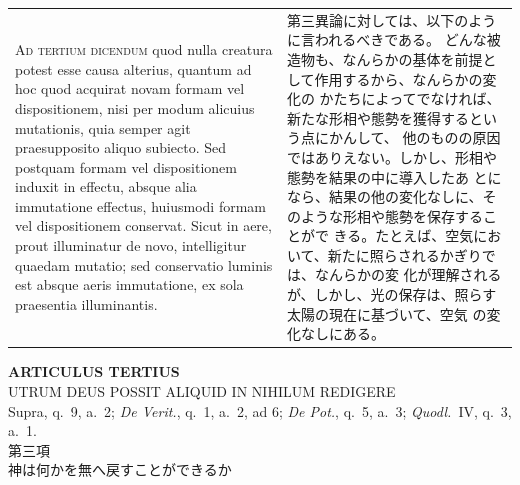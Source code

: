 \documentclass[paper=a4paper,fontsize=10pt,jafontsize=9pt,titlepage]{jlreq}
\begin{document}
\begin{longtable}{p{21em}p{21em}}
\\


{\scshape Ad tertium dicendum} quod nulla creatura
potest esse causa alterius, quantum ad hoc quod acquirat novam formam
vel dispositionem, nisi per modum alicuius mutationis, quia semper agit
praesupposito aliquo subiecto. Sed postquam formam vel dispositionem
induxit in effectu, absque alia immutatione effectus, huiusmodi formam
vel dispositionem conservat. Sicut in aere, prout illuminatur de novo,
intelligitur quaedam mutatio; sed conservatio luminis est absque aeris
immutatione, ex sola praesentia illuminantis.

&


第三異論に対しては、以下のように言われるべきである。
どんな被造物も、なんらかの基体を前提として作用するから、なんらかの変化の
 かたちによってでなければ、新たな形相や態勢を獲得するという点にかんして、
 他のものの原因ではありえない。しかし、形相や態勢を結果の中に導入したあ
 とになら、結果の他の変化なしに、そのような形相や態勢を保存することがで
 きる。たとえば、空気において、新たに照らされるかぎりでは、なんらかの変
 化が理解されるが、しかし、光の保存は、照らす太陽の現在に基づいて、空気
 の変化なしにある。


\end{longtable}
\newpage





\begin{center}
 {\Large {\bfseries ARTICULUS TERTIUS}}\\
 {\large UTRUM DEUS POSSIT ALIQUID IN NIHILUM REDIGERE}\\
 {\footnotesize Supra, q.~9, a.~2; {\itshape De Verit.}, q.~1, a.~2, ad
 6; {\itshape De Pot.}, q.~5, a.~3; {\itshape Quodl.}~IV, q.~3, a.~1.}\\
 {\Large 第三項\\神は何かを無へ戻すことができるか}
\end{center}
\end{document}
